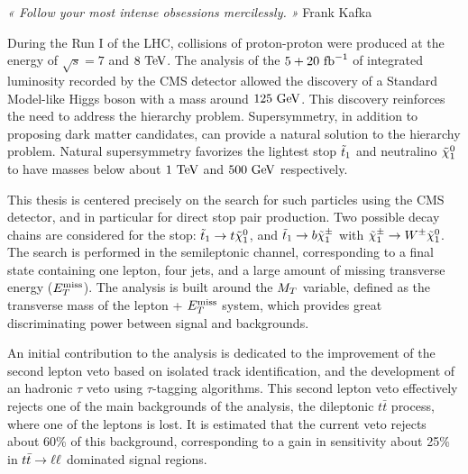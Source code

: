 \vspace*{-0.5cm}
\hspace*{0.37\textwidth}
\begin{minipage}{0.62\textwidth}
\emph{« Follow your most intense obsessions mercilessly. »}
\hspace*{0.6\textwidth} Frank Kafka
\end{minipage}

\vspace*{1cm}

During the Run I of the LHC, collisions of proton-proton were produced at the
energy of $\sqrt{s} = 7$ and $8~\text{TeV}$. The analysis of the $5+20~\text{fb}^{-1}$ of integrated luminosity
recorded by the CMS detector allowed the discovery of a Standard Model-like Higgs boson
with a mass around $125~\text{GeV}$. This discovery reinforces the need to address the hierarchy
problem. Supersymmetry, in addition to proposing dark matter candidates, can provide a natural
solution to the hierarchy problem. Natural supersymmetry favorizes the lightest stop $\tilde{t}_1$ and
neutralino $\tilde{\chi}_1^0$ to have masses below about $1~\text{TeV}$ and $500~\text{GeV}$ respectively.

This thesis is centered precisely on the search for such particles using the CMS detector, and
in particular for direct stop pair production. Two possible decay chains are considered for the stop:
$\tilde{t}_1 \rightarrow t \tilde{\chi}_1^0$, and $\tilde{t}_1 \rightarrow b \tilde{\chi}_1^\pm$ with $\tilde{\chi}_1^\pm
\rightarrow W^\pm \tilde{\chi}_1^0$. The search is performed in the semileptonic channel, corresponding
to a final state containing one lepton, four jets, and a large amount of missing transverse energy
($E_T^\text{miss}$). The analysis is built around the $M_T$ variable, defined as the transverse mass of the lepton + $E_T^\text{miss}$
system, which provides great discriminating power between signal and backgrounds.

An initial contribution to the analysis is dedicated to the improvement of the
second lepton veto based on isolated track identification, and the development of an
hadronic $\tau$ veto using $\tau$-tagging algorithms. This second lepton veto effectively
rejects one  of the main backgrounds of the analysis, the dileptonic $t\bar{t}$ process,
where one of the leptons is lost. It is estimated that the current veto rejects about
60\% of this background, corresponding to a gain in sensitivity about 25\% in $t\bar{t} \rightarrow \ell \ell$
dominated signal regions.

